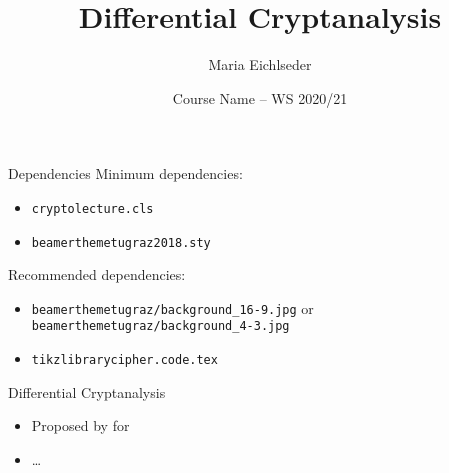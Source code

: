 \documentclass[biblatex]{cryptolecture}
\begin{document}
\title{Differential Cryptanalysis}
\author{Maria Eichlseder
}
\date{Course Name -- WS 2020/21}

\maketitle

\tableofcontents


\begin{frame}[fragile]{Dependencies}
  Minimum dependencies:
  \begin{itemize}
    \item \verb|cryptolecture.cls|
    \item \verb|beamerthemetugraz2018.sty|
  \end{itemize}
  \bigskip

  Recommended dependencies:
  \begin{itemize}
    \item \verb|beamerthemetugraz/background_16-9.jpg| or\\
          \verb|beamerthemetugraz/background_4-3.jpg|
    \item \verb|tikzlibrarycipher.code.tex|
  \end{itemize}
\end{frame}

\begin{frame}{Differential Cryptanalysis}
  \begin{itemize}
    \item Proposed by \textcite{cryptoBihamS90} for 
    \item \dots
  \end{itemize}
\end{frame}


\end{document}
